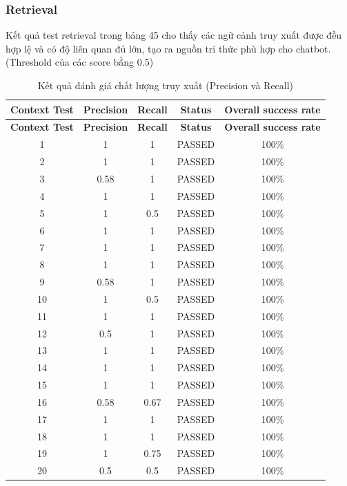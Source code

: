 \subsubsection{Retrieval}
Kết quả test retrieval trong bảng 45 cho thấy các ngữ cảnh truy xuất được đều hợp lệ và có độ liên quan đủ lớn, tạo ra nguồn tri thức phù hợp cho chatbot. (Threshold của các score bằng 0.5)
\begin{longtable}{|c|c|c|c|c|}
	\caption{Kết quả đánh giá chất lượng truy xuất (Precision và Recall)} \\
	\hline
	\textbf{Context Test} & \textbf{Precision} & \textbf{Recall} & \textbf{Status} & \textbf{Overall success rate} \\
	\hline
	\endfirsthead
	
	\hline
	\textbf{Context Test} & \textbf{Precision} & \textbf{Recall} & \textbf{Status} & \textbf{Overall success rate} \\
	\hline
	\endhead
	
	\hline
	\endfoot
	
	\hline
	\endlastfoot
	
	1  & 1    & 1     & PASSED & 100\% \\
	2  & 1    & 1     & PASSED & 100\% \\
	3  & 0.58 & 1     & PASSED & 100\% \\
	4  & 1    & 1     & PASSED & 100\% \\
	5  & 1    & 0.5   & PASSED & 100\% \\
	6  & 1    & 1     & PASSED & 100\% \\
	7  & 1    & 1     & PASSED & 100\% \\
	8  & 1    & 1     & PASSED & 100\% \\
	9  & 0.58 & 1     & PASSED & 100\% \\
	10 & 1    & 0.5   & PASSED & 100\% \\
	11 & 1    & 1     & PASSED & 100\% \\
	12 & 0.5  & 1     & PASSED & 100\% \\
	13 & 1    & 1     & PASSED & 100\% \\
	14 & 1    & 1     & PASSED & 100\% \\
	15 & 1    & 1     & PASSED & 100\% \\
	16 & 0.58 & 0.67  & PASSED & 100\% \\
	17 & 1    & 1     & PASSED & 100\% \\
	18 & 1    & 1     & PASSED & 100\% \\
	19 & 1    & 0.75  & PASSED & 100\% \\
	20 & 0.5  & 0.5   & PASSED & 100\% \\
	
\end{longtable}

